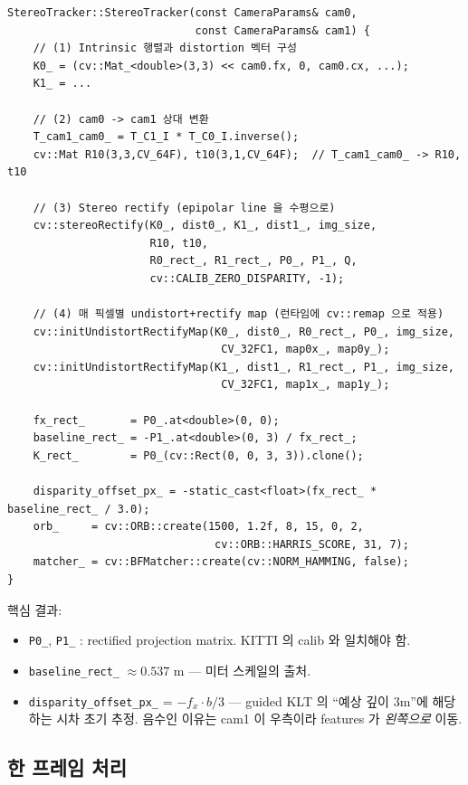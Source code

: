 \documentclass[11pt,a4paper,oneside]{report}
\begin{document}
\begin{lstlisting}[style=cpp,caption={\texttt{src/frontend/stereo\_tracker.cpp:16-91}, 핵심부 발췌}]
StereoTracker::StereoTracker(const CameraParams& cam0,
                             const CameraParams& cam1) {
    // (1) Intrinsic 행렬과 distortion 벡터 구성
    K0_ = (cv::Mat_<double>(3,3) << cam0.fx, 0, cam0.cx, ...);
    K1_ = ...

    // (2) cam0 -> cam1 상대 변환
    T_cam1_cam0_ = T_C1_I * T_C0_I.inverse();
    cv::Mat R10(3,3,CV_64F), t10(3,1,CV_64F);  // T_cam1_cam0_ -> R10, t10

    // (3) Stereo rectify (epipolar line 을 수평으로)
    cv::stereoRectify(K0_, dist0_, K1_, dist1_, img_size,
                      R10, t10,
                      R0_rect_, R1_rect_, P0_, P1_, Q,
                      cv::CALIB_ZERO_DISPARITY, -1);

    // (4) 매 픽셀별 undistort+rectify map (런타임에 cv::remap 으로 적용)
    cv::initUndistortRectifyMap(K0_, dist0_, R0_rect_, P0_, img_size,
                                 CV_32FC1, map0x_, map0y_);
    cv::initUndistortRectifyMap(K1_, dist1_, R1_rect_, P1_, img_size,
                                 CV_32FC1, map1x_, map1y_);

    fx_rect_       = P0_.at<double>(0, 0);
    baseline_rect_ = -P1_.at<double>(0, 3) / fx_rect_;
    K_rect_        = P0_(cv::Rect(0, 0, 3, 3)).clone();

    disparity_offset_px_ = -static_cast<float>(fx_rect_ * baseline_rect_ / 3.0);
    orb_     = cv::ORB::create(1500, 1.2f, 8, 15, 0, 2,
                                cv::ORB::HARRIS_SCORE, 31, 7);
    matcher_ = cv::BFMatcher::create(cv::NORM_HAMMING, false);
}
\end{lstlisting}

핵심 결과:
\begin{itemize}
\item \texttt{P0\_}, \texttt{P1\_} : rectified projection matrix. KITTI 의 calib 와 일치해야 함.
\item \texttt{baseline\_rect\_} \(\approx 0.537\) m — 미터 스케일의 출처.
\item \texttt{disparity\_offset\_px\_} = \(-f_x \cdot b / 3\) — guided KLT 의 ``예상 깊이 3m''에 해당하는 시차 초기 추정. 음수인 이유는 cam1 이 우측이라 features 가 \emph{왼쪽으로} 이동.
\end{itemize}

\subsection{한 프레임 처리}
\end{document}
